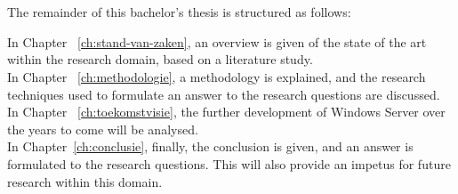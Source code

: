 \section{}
\label{sec:opzet-bachelorproef}

The remainder of this bachelor's thesis is structured as follows:

In Chapter ~\ref{ch:stand-van-zaken}, an overview is given of the state of the art within the research domain, based on a literature study.
\\

In Chapter ~\ref{ch:methodologie}, a methodology is explained, and the research techniques used to formulate an answer to the research questions are discussed.
\\

In Chapter ~\ref{ch:toekomstvisie}, the further development of Windows Server over the years to come will be analysed. 
\\

In Chapter~\ref{ch:conclusie}, finally, the conclusion is given, and an answer is formulated to the research questions. This will also provide an impetus for future research within this domain.
\\
